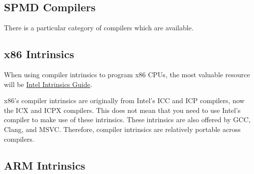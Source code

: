 \subsection{SPMD Compilers}
There is a particular category of compilers which are available.

\subsection{x86 Intrinsics}
When using compiler intrinsics to program x86 CPUs, the most valuable resource
will be
\href{https://www.intel.com/content/www/us/en/docs/intrinsics-guide/index.html}{Intel
Intrinsics Guide}.

x86's compiler intrinsics are originally from Intel's ICC and ICP compilers, now
the ICX and ICPX compilers. This does not mean that you need to use Intel's
compiler to make use of these intrinsics. These intrinsics are also offered by
GCC, Clang, and MSVC. Therefore, compiler intrinsics are relatively portable
across compilers.



\subsection{ARM Intrinsics}
